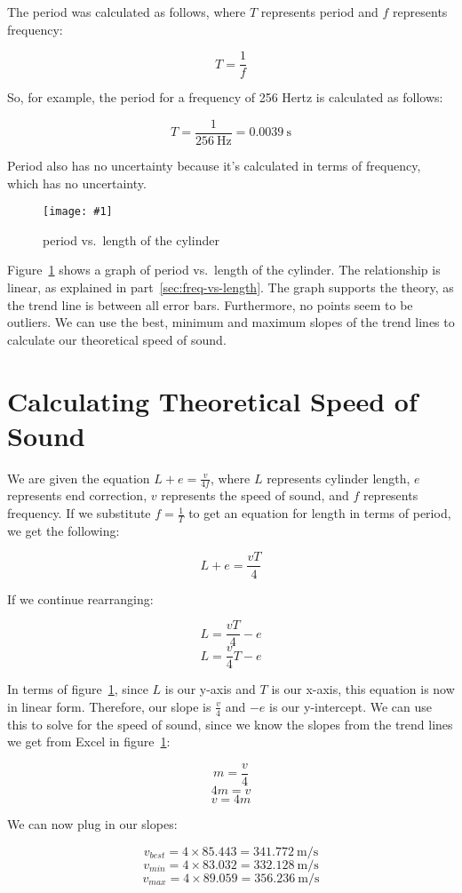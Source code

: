 \documentclass{report}
\newcommand{\graph}[2]{
  \begin{figure}[H]
    \medskip
    \centering
    \texttt{[image: \#1]}
    \caption{#2}
    \medskip\label{fig:#1}
  \end{figure}
}
\begin{document}
The period was calculated as follows, where \(T\) represents period and \(f\)
represents frequency:

\[T=\frac{1}{f}\]

So, for example, the period for a frequency of 256 Hertz is
calculated as follows:

\[T=\frac{1}{\SI{256}{\hertz}}=\SI{0.0039}{\second}\]

Period also has no uncertainty because it's calculated in terms of
frequency, which has no uncertainty.

\graph{period-vs-length}{period vs.\ length of the cylinder}

Figure~\ref{fig:period-vs-length} shows a graph of period vs.\ length
of the cylinder. The relationship is linear, as explained in
part~\ref{sec:freq-vs-length}. The graph supports the theory, as the
trend line is between all error bars. Furthermore, no points seem to
be outliers. We can use the best, minimum and maximum slopes of the
trend lines to calculate our theoretical speed of sound.

\section{Calculating Theoretical Speed of Sound}\label{sec:theoretical-speed}

We are given the equation \(L+e=\frac{v}{4f}\), where \(L\) represents cylinder
length, \(e\) represents end correction, \(v\) represents the speed of sound,
and \(f\) represents frequency. If we substitute \(f=\frac{1}{T}\) to get
an equation for length in terms of period, we get the following:

\[L+e=\frac{vT}{4}\]

If we continue rearranging:

\[L=\frac{vT}{4}-e\]
\[L=\frac{v}{4}T-e\]

In terms of figure~\ref{fig:period-vs-length}, since \(L\) is our
y-axis and \(T\) is our x-axis, this equation is now in linear form.
Therefore, our slope is \(\frac{v}{4}\) and \(-e\) is our
y-intercept. We can use this to solve for the speed of sound, since
we know the slopes from the trend lines we get from Excel in
figure~\ref{fig:period-vs-length}:

\[m=\frac{v}{4}\]
\[4m=v\]
\[v=4m\]

We can now plug in our slopes:

\[v_{best}=4\times85.443=\SI{341.772}{\metre\per\second}\]
\[v_{min}=4\times83.032=\SI{332.128}{\metre\per\second}\]
\[v_{max}=4\times89.059=\SI{356.236}{\metre\per\second}\]
\end{document}
